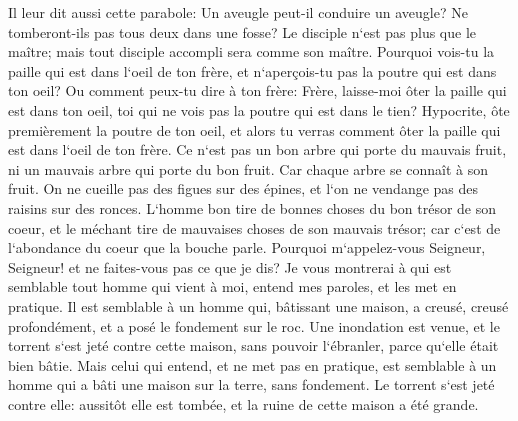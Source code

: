 \verse Il leur dit aussi cette parabole: Un aveugle peut-il conduire un aveugle? Ne tomberont-ils pas tous deux dans une fosse? 
\verse Le disciple n`est pas plus que le maître; mais tout disciple accompli sera comme son maître. 
\verse Pourquoi vois-tu la paille qui est dans l`oeil de ton frère, et n`aperçois-tu pas la poutre qui est dans ton oeil? 
\verse Ou comment peux-tu dire à ton frère: Frère, laisse-moi ôter la paille qui est dans ton oeil, toi qui ne vois pas la poutre qui est dans le tien? Hypocrite, ôte premièrement la poutre de ton oeil, et alors tu verras comment ôter la paille qui est dans l`oeil de ton frère. 
\verse Ce n`est pas un bon arbre qui porte du mauvais fruit, ni un mauvais arbre qui porte du bon fruit. 
\verse Car chaque arbre se connaît à son fruit. On ne cueille pas des figues sur des épines, et l`on ne vendange pas des raisins sur des ronces. 
\verse L`homme bon tire de bonnes choses du bon trésor de son coeur, et le méchant tire de mauvaises choses de son mauvais trésor; car c`est de l`abondance du coeur que la bouche parle. 
\verse Pourquoi m`appelez-vous Seigneur, Seigneur! et ne faites-vous pas ce que je dis? 
\verse Je vous montrerai à qui est semblable tout homme qui vient à moi, entend mes paroles, et les met en pratique. 
\verse Il est semblable à un homme qui, bâtissant une maison, a creusé, creusé profondément, et a posé le fondement sur le roc. Une inondation est venue, et le torrent s`est jeté contre cette maison, sans pouvoir l`ébranler, parce qu`elle était bien bâtie. 
\verse Mais celui qui entend, et ne met pas en pratique, est semblable à un homme qui a bâti une maison sur la terre, sans fondement. Le torrent s`est jeté contre elle: aussitôt elle est tombée, et la ruine de cette maison a été grande. 

\chapter{}


